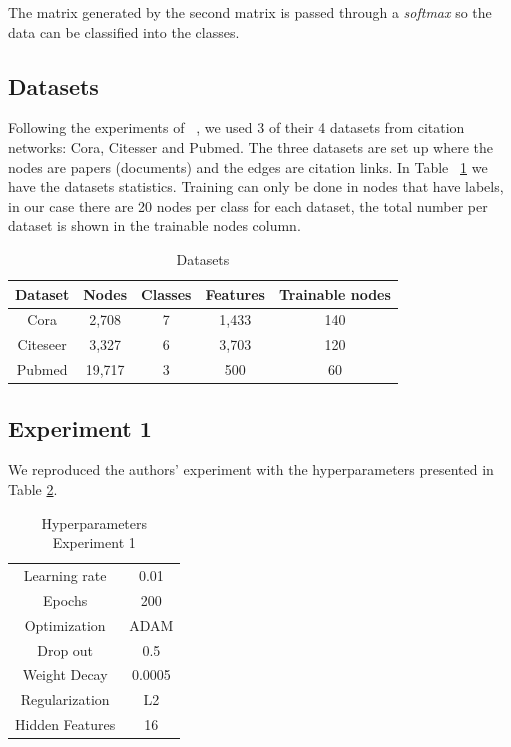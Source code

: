 The matrix generated by the second matrix is passed through a \textit{softmax} so the data can be classified into the classes.


\subsection{Datasets}

Following the experiments of ~\cite{Kipf2016}, we used 3 of their 4 datasets from citation networks: Cora, Citesser and Pubmed. The three datasets are set up where the nodes are papers (documents) and the edges are citation links. In Table ~\ref{tab:datasets} we have the datasets statistics. Training can only be done in nodes that have labels, in our case there are 20 nodes per class for each dataset, the total number per dataset is shown in the trainable nodes column.

\begin {table}[ht]
  \begin{center}
    \begin{tabular}{|c|c|c|c|c|}
    \hline
    Dataset  & Nodes  & Classes & Features & Trainable nodes\\
    \hline 
    Cora     & 2,708  & 7       & 1,433    & 140 \\ 
    Citeseer & 3,327  & 6       & 3,703    & 120  \\  
    Pubmed   & 19,717 & 3       & 500      & 60   \\
    \hline
    \end{tabular}
  \end{center}
\caption {Datasets} \label{tab:datasets} 
\end{table}

\subsection{Experiment 1}

We reproduced the authors' experiment with the hyperparameters presented in Table \ref{tab:hyperparameters1}.

\begin {table}[ht]
  \begin{center}
    \begin{tabular}{|c|c|}
    \hline
    Learning rate     & 0.01 \\ 
    Epochs            & 200  \\ 
    Optimization      & ADAM \\
    Drop out          & 0.5   \\
    Weight Decay      & 0.0005 \\
    Regularization    & L2    \\
    Hidden Features   & 16    \\
    \hline
    \end{tabular}
  \end{center}
\caption {Hyperparameters Experiment 1} \label{tab:hyperparameters1} 
\end{table}

